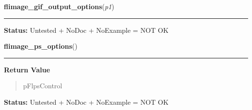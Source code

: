     \label{xformslib:library:flimage_gif_output_options}

    \vspace{0.5ex}

\hspace{.8\funcindent}\begin{boxedminipage}{\funcwidth}

    \raggedright \textbf{flimage\_gif\_output\_options}(\textit{p1})

    \vspace{-1.5ex}

    \rule{\textwidth}{0.5\fboxrule}
\setlength{\parskip}{2ex}
\setlength{\parskip}{1ex}
\textbf{Status:} Untested + NoDoc + NoExample = NOT OK



    \end{boxedminipage}

    \label{xformslib:library:flimage_ps_options}

    \vspace{0.5ex}

\hspace{.8\funcindent}\begin{boxedminipage}{\funcwidth}

    \raggedright \textbf{flimage\_ps\_options}()

    \vspace{-1.5ex}

    \rule{\textwidth}{0.5\fboxrule}
\setlength{\parskip}{2ex}
\setlength{\parskip}{1ex}
      \textbf{Return Value}
    \vspace{-1ex}

      \begin{quote}
      pFlpsControl

      \end{quote}

\textbf{Status:} Untested + NoDoc + NoExample = NOT OK



    \end{boxedminipage}

    \label{xformslib:library:flimage_jpeg_output_options}

